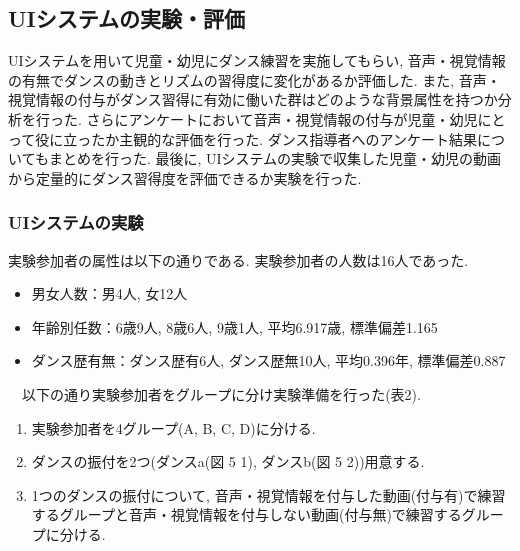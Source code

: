 \documentclass[paper]{ieicej}
\begin{document}
\subsection{UIシステムの実験・評価}
UIシステムを用いて児童・幼児にダンス練習を実施してもらい, 音声・視覚情報の有無でダンスの動きとリズムの習得度に変化があるか評価した. また, 音声・視覚情報の付与がダンス習得に有効に働いた群はどのような背景属性を持つか分析を行った. さらにアンケートにおいて音声・視覚情報の付与が児童・幼児にとって役に立ったか主観的な評価を行った. ダンス指導者へのアンケート結果についてもまとめを行った. 最後に, UIシステムの実験で収集した児童・幼児の動画から定量的にダンス習得度を評価できるか実験を行った. 
\subsubsection{UIシステムの実験}
実験参加者の属性は以下の通りである. 実験参加者の人数は16人であった. 
\begin{itemize}[nosep]
  \item 男女人数：男4人, 女12人
  \item 年齢別任数：6歳9人, 8歳6人, 9歳1人, 平均6.917歳, 標準偏差1.165 
  \item ダンス歴有無：ダンス歴有6人, ダンス歴無10人, 平均0.396年, 標準偏差0.887
\end{itemize}
　以下の通り実験参加者をグループに分け実験準備を行った(表2).
\begin{enumerate}[label=\arabic*., nosep]
  \item 実験参加者を4グループ(A, B, C, D)に分ける. 
  \item ダンスの振付を2つ(ダンスa(図 5 1), ダンスb(図 5 2))用意する. 
  \item 1つのダンスの振付について, 音声・視覚情報を付与した動画(付与有)で練習するグループと音声・視覚情報を付与しない動画(付与無)で練習するグループに分ける. 
\end{enumerate}
\end{document}
